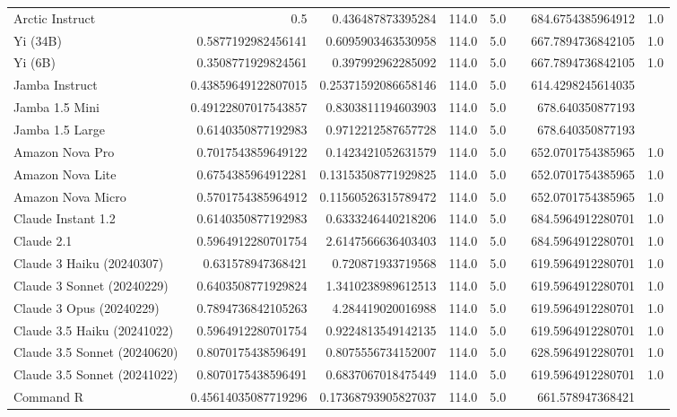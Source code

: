 \begin{table}[htp]
{\begin{tabular}{lrrrrrrr}
Arctic Instruct & 0.5 & 0.436487873395284 & 114.0 & 5.0 &  & 684.6754385964912 & 1.0 \\
Yi (34B) & 0.5877192982456141 & 0.6095903463530958 & 114.0 & 5.0 &  & 667.7894736842105 & 1.0 \\
Yi (6B) & 0.3508771929824561 & 0.397992962285092 & 114.0 & 5.0 &  & 667.7894736842105 & 1.0 \\
Jamba Instruct & 0.43859649122807015 & 0.25371592086658146 & 114.0 & 5.0 &  & 614.4298245614035 &  \\
Jamba 1.5 Mini & 0.49122807017543857 & 0.8303811194603903 & 114.0 & 5.0 &  & 678.640350877193 &  \\
Jamba 1.5 Large & 0.6140350877192983 & 0.9712212587657728 & 114.0 & 5.0 &  & 678.640350877193 &  \\
Amazon Nova Pro & 0.7017543859649122 & 0.1423421052631579 & 114.0 & 5.0 &  & 652.0701754385965 & 1.0 \\
Amazon Nova Lite & 0.6754385964912281 & 0.13153508771929825 & 114.0 & 5.0 &  & 652.0701754385965 & 1.0 \\
Amazon Nova Micro & 0.5701754385964912 & 0.11560526315789472 & 114.0 & 5.0 &  & 652.0701754385965 & 1.0 \\
Claude Instant 1.2 & 0.6140350877192983 & 0.6333246440218206 & 114.0 & 5.0 &  & 684.5964912280701 & 1.0 \\
Claude 2.1 & 0.5964912280701754 & 2.6147566636403403 & 114.0 & 5.0 &  & 684.5964912280701 & 1.0 \\
Claude 3 Haiku (20240307) & 0.631578947368421 & 0.720871933719568 & 114.0 & 5.0 &  & 619.5964912280701 & 1.0 \\
Claude 3 Sonnet (20240229) & 0.6403508771929824 & 1.3410238989612513 & 114.0 & 5.0 &  & 619.5964912280701 & 1.0 \\
Claude 3 Opus (20240229) & 0.7894736842105263 & 4.284419020016988 & 114.0 & 5.0 &  & 619.5964912280701 & 1.0 \\
Claude 3.5 Haiku (20241022) & 0.5964912280701754 & 0.9224813549142135 & 114.0 & 5.0 &  & 619.5964912280701 & 1.0 \\
Claude 3.5 Sonnet (20240620) & 0.8070175438596491 & 0.8075556734152007 & 114.0 & 5.0 &  & 628.5964912280701 & 1.0 \\
Claude 3.5 Sonnet (20241022) & 0.8070175438596491 & 0.6837067018475449 & 114.0 & 5.0 &  & 619.5964912280701 & 1.0 \\
Command R & 0.45614035087719296 & 0.17368793905827037 & 114.0 & 5.0 &  & 661.578947368421 &  \\

\end{tabular}}
\end{table}
